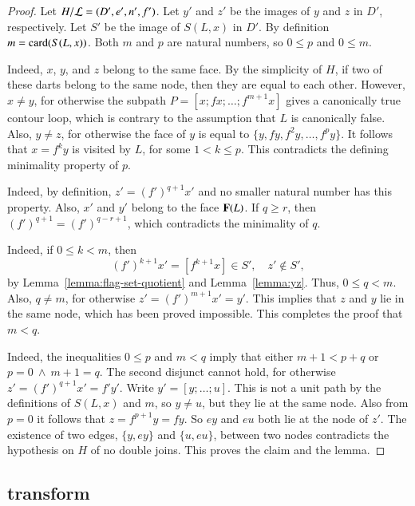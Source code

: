 \begin{proof}
Let $H/{\cal L}=(D',e',n',f')$.  Let $y'$ and $z'$ be the images of $y$ and $z$
in $D'$, respectively.  Let $S'$ be the image of $S(L,x)$ in $D'$.
By definition $m = {\operatorname{card}}(S(L,x))$.  Both $m$ and $p$ are natural numbers,
so $0\le p$ and $0\le m$. 

  Indeed, $x$, $y$, and $z$ belong to
the same face.  By the simplicity of $H$, if two of these darts belong
to the same node, then they are equal to each other.  However, $x\ne
y$, for otherwise the subpath $P=[x;f x;\ldots;f^{m+1}x]$ gives a canonically true contour loop, which is contrary to the assumption that $L$ is
canonically false.  Also, $y\ne z$, for otherwise the face of $y$ is
equal to $\{y,f y,f^2 y,\ldots,f^p y\}$.  It follows that $x = f^k y$
is visited by $L$, for some $1<k\le p$.  This contradicts the defining
minimality property of $p$.

  Indeed,
by definition, $z' = (f')^{q+1} x'$ and no smaller natural
number has this property.  Also, $x'$ and $y'$ belong to the face ${\mathbf F}(L)$.
If $q\ge r$, then $(f')^{q+1} = (f')^{q-r+1}$, which contradicts the minimality of $q$.

 Indeed, if $0\le k< m$, then
\begin{displaymath}
(f')^{k+1} x' = [f^{k+1} x]\in S', \quad z' \not\in S',
\end{displaymath}
by Lemma~\ref{lemma:flag-set-quotient} and Lemma~\ref{lemma:yz}.
Thus, $0\le q< m$.  Also, $q\ne m$, for otherwise $z' = (f')^{m+1} x'
= y'$.  This implies that $z$ and $y$ lie in the same node, which has
been proved impossible.  This completes the proof that $m<q$.
 
  Indeed, the inequalities $0\le p$ and $m<q$ imply
that either $m+1 < p+q$ or $p=0~\land~m+1=q$.  The second disjunct
cannot hold, for otherwise $z' = (f')^{q+1} x' = f' y'$.  Write $y' = [y;\ldots;u]$.
This is not a unit path by the definitions of $S(L,x)$ and $m$, so $y\ne u$, but
they lie at the same node.  Also from $p=0$ it follows that $z= f^{p+1} y = f y$.
So $e y$ and $e u$ both lie at the node of $z'$.  The existence of
 two edges, $\{y, e y\}$ and
$\{u, e u\}$, between two nodes contradicts the hypothesis
on $H$ of no double joins.  This proves the claim and the lemma.
\end{proof}

\subsection{transform}

